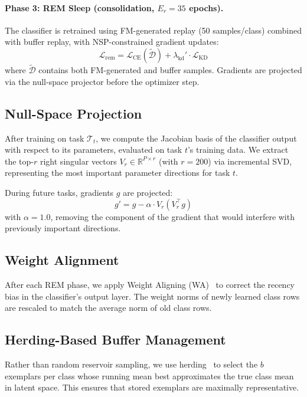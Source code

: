 \documentclass[10pt,twocolumn,letterpaper]{article}
\begin{document}
\paragraph{Phase 3: REM Sleep (consolidation, $E_r=35$ epochs).}
The classifier is retrained using FM-generated replay (50 samples/class) combined with buffer replay, with NSP-constrained gradient updates:
\begin{equation}
  \mathcal{L}_\text{rem} = \mathcal{L}_\text{CE}(\tilde{\mathcal{D}}) + \lambda_\text{kd}' \cdot \mathcal{L}_\text{KD}
\end{equation}
where $\tilde{\mathcal{D}}$ contains both FM-generated and buffer samples. Gradients are projected via the null-space projector before the optimizer step.

\subsection{Null-Space Projection}
\label{sec:nsp}

After training on task $\mathcal{T}_t$, we compute the Jacobian basis of the classifier output with respect to its parameters, evaluated on task $t$'s training data. We extract the top-$r$ right singular vectors $V_r \in \mathbb{R}^{P \times r}$ (with $r=200$) via incremental SVD, representing the most important parameter directions for task $t$.

During future tasks, gradients $g$ are projected:
\begin{equation}
  g' = g - \alpha \cdot V_r (V_r^\top g)
\end{equation}
with $\alpha=1.0$, removing the component of the gradient that would interfere with previously important directions.

\subsection{Weight Alignment}
\label{sec:wa}

After each REM phase, we apply Weight Aligning (WA)~\cite{zhao2020maintaining} to correct the recency bias in the classifier's output layer. The weight norms of newly learned class rows are rescaled to match the average norm of old class rows.

\subsection{Herding-Based Buffer Management}
\label{sec:herding}

Rather than random reservoir sampling, we use herding~\cite{welling2009herding} to select the $b$ exemplars per class whose running mean best approximates the true class mean in latent space. This ensures that stored exemplars are maximally representative.
\end{document}
